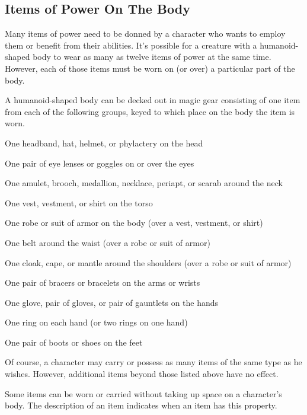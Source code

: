 \subsection{Items of Power On The Body}
Many items of power need to be donned by a character who wants to employ them or benefit from their abilities. It's possible for a creature with a humanoid-shaped body to wear as many as twelve items of power at the same time. However, each of those items must be worn on (or over) a particular part of the body.

A humanoid-shaped body can be decked out in magic gear consisting of one item from each of the following groups, keyed to which place on the body the item is worn.

\begin{itemize*}
\item One headband, hat, helmet, or phylactery on the head
\item One pair of eye lenses or goggles on or over the eyes
\item One amulet, brooch, medallion, necklace, periapt, or scarab around the neck
\item One vest, vestment, or shirt on the torso
\item One robe or suit of armor on the body (over a vest, vestment, or shirt)
\item One belt around the waist (over a robe or suit of armor)
\item One cloak, cape, or mantle around the shoulders (over a robe or suit of armor)
\item One pair of bracers or bracelets on the arms or wrists
\item One glove, pair of gloves, or pair of gauntlets on the hands
\item One ring on each hand (or two rings on one hand)
\item One pair of boots or shoes on the feet
\end{itemize*}

Of course, a character may carry or possess as many items of the same type as he wishes. However, additional items beyond those listed above have no effect.

Some items can be worn or carried without taking up space on a character's body. The description of an item indicates when an item has this property. 